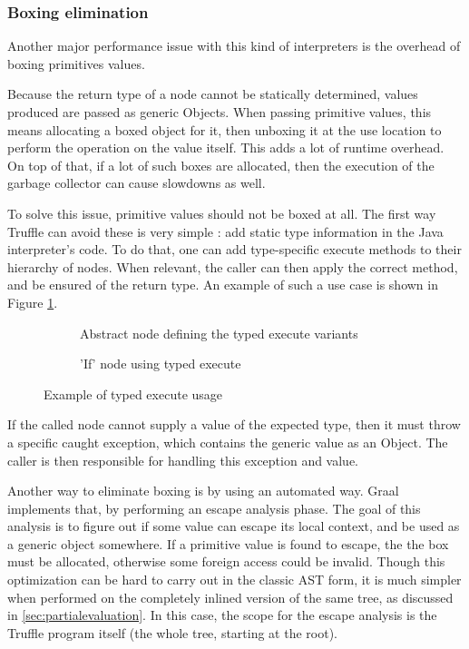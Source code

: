 \documentclass[twoside,11pt,a4paper]{article}
\newcommand{\java}[1]{\textsf{#1}}
\begin{document}
\subsubsection{Boxing elimination}

Another major performance issue with this kind of interpreters is the overhead of boxing primitives values.

Because the return type of a node cannot be statically determined, values produced are passed as generic \java{Objects}. When passing primitive values, this means allocating a boxed object for it, then unboxing it at the use location to perform the operation on the value itself. This adds a lot of runtime overhead. On top of that, if a lot of such boxes are allocated, then the execution of the garbage collector can cause slowdowns as well.

To solve this issue, primitive values should not be boxed at all. The first way Truffle can avoid these is very simple : add static type information in the Java interpreter's code. To do that, one can add type-specific \java{execute} methods to their hierarchy of nodes. When relevant, the caller can then apply the correct method, and be ensured of the return type. An example of such a use case is shown in Figure \ref{fig:truffleifnode}.


\begin{figure}[th]

	\begin{subfigure}[h]{\textwidth}
		
		\caption{Abstract node defining the typed execute variants}
	\end{subfigure}
	
	\begin{subfigure}[h]{\textwidth}
		
		\caption{'If' node using typed execute}
	\end{subfigure}
	
	\caption{Example of typed execute usage}
	\label{fig:truffleifnode}
\end{figure}

If the called node cannot supply a value of the expected type, then it must throw a specific caught exception, which contains the generic value as an \java{Object}. The caller is then responsible for handling this exception and value.

Another way to eliminate boxing is by using an automated way. Graal implements that, by performing an escape analysis phase. The goal of this analysis is to figure out if some value can escape its local context, and be used as a generic object somewhere. If a primitive value is found to escape, the the box must be allocated, otherwise some foreign access could be invalid. Though this optimization can be hard to carry out in the classic AST form, it is much simpler when performed on the completely inlined version of the same tree, as discussed in \ref{sec:partialevaluation}. In this case, the scope for the escape analysis is the Truffle program itself (the whole tree, starting at the root).
\end{document}
